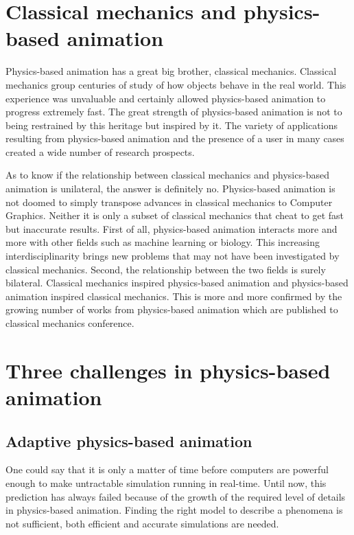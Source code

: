 \section{Classical mechanics and physics-based animation}

Physics-based animation has a great big brother, classical mechanics. Classical mechanics group centuries of study of how objects behave in the real world. This experience was unvaluable and certainly allowed physics-based animation to progress extremely fast. The great strength of physics-based animation is not to being restrained by this heritage but inspired by it. The variety of applications resulting from physics-based animation and the presence of a user in many cases  created a wide number of research prospects.

As to know if the relationship between classical mechanics and physics-based animation is unilateral, the answer is definitely no. Physics-based animation is not doomed to simply transpose advances in classical mechanics to Computer Graphics. Neither it is only a subset of classical mechanics that cheat to get fast but inaccurate results. First of all, physics-based animation interacts more and more with other fields such as machine learning or biology. This increasing interdisciplinarity brings new problems that may not have been investigated by classical mechanics. Second, the relationship between the two fields is surely bilateral. Classical mechanics inspired physics-based animation and physics-based animation inspired classical mechanics. This is more and more confirmed by the growing number of works from physics-based animation which are published to classical mechanics conference.

\section{Three challenges in physics-based animation}

\subsection{Adaptive physics-based animation}
One could say that it is only a matter of time before computers are powerful enough to make untractable simulation running in real-time. Until now, this prediction has always failed because of the growth of the required level of details in physics-based animation. Finding the right model to describe a phenomena is not sufficient, both efficient and accurate simulations are needed.


